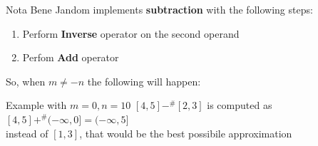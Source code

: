 \documentclass{beamer}
\begin{document}
	\begin{frame}{Nota Bene}
		Jandom implements \textbf{subtraction} with the following steps:\\
		\begin{enumerate}
			\item Perform \textbf{Inverse} operator on the second operand
			\item Perfom \textbf{Add} operator\\
		\end{enumerate}
		So, when $m \neq -n$ the following will happen:
			\begin{exampleblock}{Example with $m = 0, n = 10$}
				$[4,5] -^\# [2,3]$ is computed as $[4,5] +^\# (-\infty,0] = (-\infty,5]$ \\instead of $[1,3]$, that would be the best possibile approximation
			\end{exampleblock}
	\end{frame}
\end{document}
